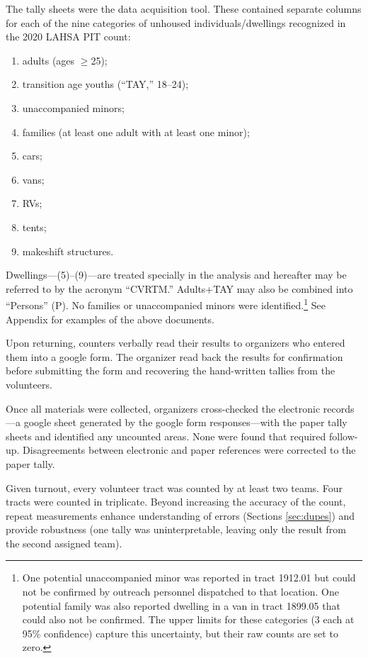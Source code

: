 \documentclass[11pt,twocolumn]{article}
\def\bfr{\bf\color{red}}
\begin{document}
The tally sheets were the data acquisition tool. These contained separate columns for each of the 
nine categories of unhoused individuals/dwellings recognized in the 2020 LAHSA PIT count: 
\begin{enumerate}
	\item adults (ages $\geq$25);
	\item transition age youths (``TAY,'' 18--24);
	\item unaccompanied minors;
	\item families (at least one adult with at least one minor); 
	\item cars;
	\item vans;
	\item RVs;
	\item tents;
	\item makeshift structures.
\end{enumerate}
Dwellings---(5)--(9)---are treated specially in the analysis and hereafter 
may be referred to by the acronym ``CVRTM.'' Adults+TAY may also be combined into 
``Persons'' (P). No families or unaccompanied minors were identified.\footnote{
One potential unaccompanied minor was reported in tract 1912.01 but could not be confirmed by outreach
personnel dispatched to that location. One potential family was also reported dwelling in a van in
tract 1899.05 that could also not be confirmed. The upper limits for these categories (3 each at 95\%
confidence) capture this uncertainty, but their raw counts are set to zero.} See Appendix for examples
of the above documents.

Upon returning, counters verbally read their results to organizers who entered them into a google 
form. The organizer read back the results for confirmation before submitting the form and recovering the
hand-written tallies from the volunteers. 

Once all materials were collected, organizers cross-checked the electronic records---a
google sheet generated by the google form responses---with the paper tally sheets and 
identified any uncounted areas. None were found that required follow-up. Disagreements 
between electronic and paper references were corrected to the paper tally. 

Given turnout, every volunteer tract was counted by at least two teams. Four tracts were counted
in triplicate. Beyond increasing the accuracy of the count, repeat measurements enhance understanding of 
errors (Sections \ref{sec:dupes}) and provide robustness (one tally was uninterpretable, leaving only the 
result from the second assigned team).
\end{document}
